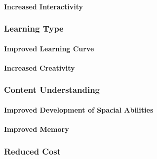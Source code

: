 \paragraph*{Increased Interactivity}
\subsubsection{Learning Type}
\paragraph*{Improved Learning Curve}
\paragraph*{Increased Creativity}
\subsubsection{Content Understanding}
\paragraph*{Improved Development of Spacial Abilities}
\paragraph*{Improved Memory}
\subsubsection{Reduced Cost}